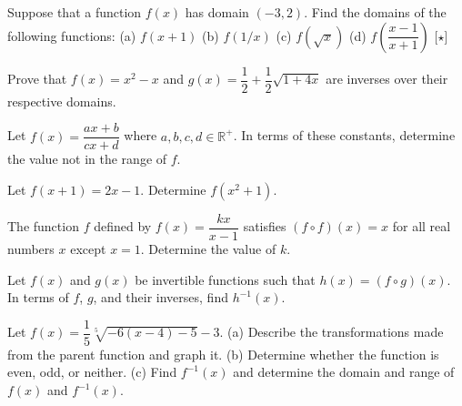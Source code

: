 \documentclass[../book.tex]{subfiles}
\begin{document}
\begin{challengeset}

\item Suppose that a function $f(x)$ has domain $(-3,2)$.  Find the domains of the following functions: \newline 
(a) $f(x+1)$ \hspace{15mm} (b) $f(1/x)$ \hspace{15mm} (c) $f(\sqrt{x})$ \hspace{15mm} (d) $f\left(\dfrac{x-1}{x+1}\right)$ [$\star$] \vspace{2mm}

\item Prove that $f(x)=x^2-x$ and $g(x)=\dfrac{1}{2}+\dfrac{1}{2}\sqrt{1+4x}$ are inverses over their respective domains.  \vspace{2mm}

\item Let $f(x)=\dfrac{ax+b}{cx+d}$ where $a,b,c,d\in\mathbb{R}^+$.  In terms of these constants, determine the value not in the range of $f$.  \vspace{2mm}

\item Let $f(x+1)=2x-1$.  Determine $f\left(x^2+1\right)$.  \vspace{2mm}

\item The function $f$ defined by $f(x)=\dfrac{kx}{x-1}$ satisfies $(f\circ f)(x)=x$ for all real numbers $x$ except $x=1$.  Determine the value of $k$.  \vspace{2mm}

\item Let $f(x)$ and $g(x)$ be invertible functions such that $h(x)=(f\circ g)(x)$.  In terms of $f$, $g$, and their inverses, find $h^{-1}(x)$.  \vspace{2mm}

\item Let $f(x)=\dfrac{1}{5}\sqrt[5]{-6(x-4)-5}-3$.  \newline 
(a) Describe the transformations made from the parent function and graph it.  \newline 
(b) Determine whether the function is even, odd, or neither.  \newline
(c) Find $f^{-1}(x)$ and determine the domain and range of $f(x)$ and $f^{-1}(x)$.
\end{challengeset}
\end{document}
